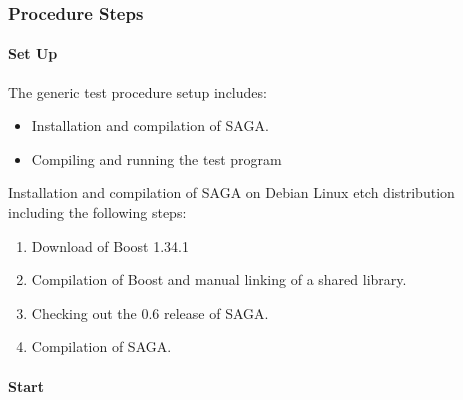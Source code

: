 \subsubsection{Procedure Steps}


\paragraph{Set Up}

The generic test procedure setup includes:
\begin{itemize}
\item Installation and compilation of SAGA.
\item Compiling and running the test program
\end{itemize}

Installation and compilation of SAGA on Debian Linux etch
distribution including the following steps:
\begin{enumerate}
 \item Download of Boost 1.34.1 
 \item Compilation of Boost and manual linking of  a shared library.
 \item Checking out the 0.6 release of SAGA.
 \item Compilation of SAGA.
\end{enumerate}



\paragraph{Start}

